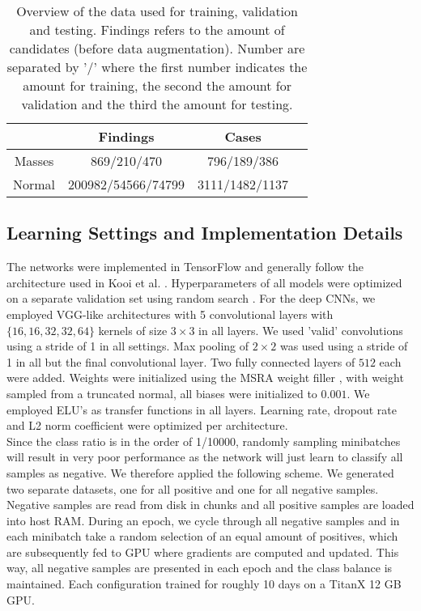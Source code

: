 \documentclass[12pt]{spieman}  %
\begin{document}
\begin{table}
\centering
 \caption{Overview of the data used for training, validation and testing. Findings refers to the amount of candidates (before data augmentation). Number are separated by '/' where the first number indicates the amount for training, the second the amount for validation and the third the amount for testing.}
 \label{tab::data_overview}
 \begin{tabular}{|c|c|c|c|}\hline
			&    {\bf Findings}		&	{\bf Cases}	\\\hline
  Masses		&	869/210/470		&	796/189/386	\\
  Normal		&	200982/54566/74799	&	3111/1482/1137	\\\hline
 \end{tabular}
\end{table}

\subsection{Learning Settings and Implementation Details}
The networks were implemented in TensorFlow \cite{Abad16} and generally follow the architecture used in Kooi et al. \cite{Kooi16}. Hyperparameters of all models were optimized on a separate validation set using random search \cite{Berg12d}. For the deep CNNs, we employed VGG-like \cite{Simo14} architectures with 5 convolutional layers with $\{16, 16, 32, 32, 64\}$ kernels of size $3 \times 3$ in all layers. We used 'valid' convolutions using a stride of 1 in all settings. Max pooling of $2 \times 2$ was used using a stride of 1 in all but the final convolutional layer. Two fully connected layers of $512$ each were added. Weights were initialized using the MSRA weight filler \cite{He15}, with weight sampled from a truncated normal, all biases were initialized to $0.001$. We employed ELU's \cite{Clev15} as transfer functions in all layers. Learning rate, dropout rate and L2 norm coefficient were optimized per architecture. \\

Since the class ratio is in the order of 1/10000, randomly sampling minibatches will result in very poor performance as the network will just learn to classify all samples as negative. We therefore applied the following scheme. We generated two separate datasets, one for all positive and one for all negative samples. Negative samples are read from disk in chunks and all positive samples are loaded into host RAM. During an epoch, we cycle through all negative samples and in each minibatch take a random selection of an equal amount of positives, which are subsequently fed to GPU where gradients are computed and updated. This way, all negative samples are presented in each epoch and the class balance is maintained. Each configuration trained for roughly 10 days on a TitanX 12 GB GPU. \\
\end{document}
